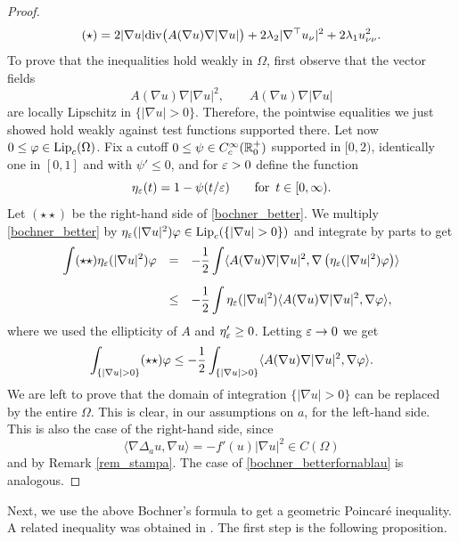 \documentclass[10 pt,a4paper]{article}
\theoremstyle{definition}
\begin{document}
\begin{proof}
	$$
		(\star) = 2 |\nabla u| \mathrm{div} \big( A(\nabla u) \nabla |\nabla u|\big) + 2\lambda_2 |\nabla^\top   u_\nu|^2 + 2 \lambda_1 u_{\nu\nu}^2.
	$$
	To prove that the inequalities hold weakly in $\Omega$, first observe that the vector fields 
	\[
		A(\nabla u)\nabla |\nabla u|^2, \qquad A(\nabla u) \nabla |\nabla u|
	\]
	are locally Lipschitz in $\{|\nabla u|>0\}$. Therefore, the pointwise equalities we just showed hold weakly against test functions supported there. Let now $0 \le \varphi \in \mathrm{Lip}_c(\Omega)$. Fix a cutoff $0 \le \psi \in C^\infty_c(\mathbb R^+_0)$ supported in $[0,2)$, identically one in $[0,1]$ and with $\psi' \le 0$, and for $\varepsilon > 0$ define the function
	\[
		\eta_\varepsilon(t) = 1-\psi(t/\varepsilon) \qquad \text{for } \, t \in [0,\infty).
	\]
	Let $(\star \star)$ be the right-hand side of \eqref{bochner_better}. We multiply \eqref{bochner_better} by $\eta_\eps(|\nabla u|^2)\varphi \in \lip_c(\{|\nabla u|>0\})$ and integrate by parts to get
	\[
		\begin{array}{lcl}
			\displaystyle \int (\star\star)\eta_\varepsilon(|\nabla u|^2)\varphi & = & \displaystyle - \frac{1}{2} \int \langle A(\nabla u) \nabla |\nabla u|^2, \nabla \left( \eta_\varepsilon(|\nabla u|^2)\varphi\right) \rangle \\[0.5cm]
			& \le & \displaystyle - \frac{1}{2} \int \eta_\varepsilon(|\nabla u|^2) \langle A(\nabla u) \nabla |\nabla u|^2, \nabla\varphi \rangle,  
		\end{array}
	\]
	where we used the ellipticity of $A$ and $\eta_\varepsilon' \ge 0$. Letting $\varepsilon \to 0$ we get
	\[
		\int_{\{|\nabla u|>0\}} (\star\star)\varphi \le \disp - \frac{1}{2} \int_{\{|\nabla u|>0\}} \langle A(\nabla u) \nabla |\nabla u|^2, \nabla\varphi \rangle.  
	\]
	We are left to prove that the domain of integration $\{|\nabla u|>0\}$ can be replaced by the entire $\Omega$. This is clear, in our assumptions on $a$, for the left-hand side. This is also the case of the right-hand side, since 
	\[
		\langle \nabla \Delta_a u, \nabla u \rangle = - f'(u)|\nabla u|^2 \in C(\Omega)
	\]
	and by Remark \ref{rem_stampa}. The case of \eqref{bochner_betterfornablau} is analogous.
\end{proof}

Next, we use the above Bochner's formula to get  a geometric Poincar\'e inequality. A related inequality was obtained in \cite{DPV}. The first step is the following proposition.
\end{document}

